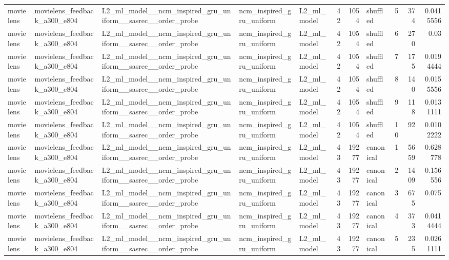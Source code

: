 \begin{table}[htbp!]
\begin{tabular}{lllllrrlrrr}
movielens & movielens\_feedback\_a300\_e804 & L2\_ml\_model\_\_ncm\_inspired\_gru\_uniform\_\_sasrec\_\_order\_probe & ncm\_inspired\_gru\_uniform & L2\_ml\_model & 42 & 1054 & shuffled & 5 & 374 & 0.0415556 \\
movielens & movielens\_feedback\_a300\_e804 & L2\_ml\_model\_\_ncm\_inspired\_gru\_uniform\_\_sasrec\_\_order\_probe & ncm\_inspired\_gru\_uniform & L2\_ml\_model & 42 & 1054 & shuffled & 6 & 270 & 0.03 \\
movielens & movielens\_feedback\_a300\_e804 & L2\_ml\_model\_\_ncm\_inspired\_gru\_uniform\_\_sasrec\_\_order\_probe & ncm\_inspired\_gru\_uniform & L2\_ml\_model & 42 & 1054 & shuffled & 7 & 175 & 0.0194444 \\
movielens & movielens\_feedback\_a300\_e804 & L2\_ml\_model\_\_ncm\_inspired\_gru\_uniform\_\_sasrec\_\_order\_probe & ncm\_inspired\_gru\_uniform & L2\_ml\_model & 42 & 1054 & shuffled & 8 & 140 & 0.0155556 \\
movielens & movielens\_feedback\_a300\_e804 & L2\_ml\_model\_\_ncm\_inspired\_gru\_uniform\_\_sasrec\_\_order\_probe & ncm\_inspired\_gru\_uniform & L2\_ml\_model & 42 & 1054 & shuffled & 9 & 118 & 0.0131111 \\
movielens & movielens\_feedback\_a300\_e804 & L2\_ml\_model\_\_ncm\_inspired\_gru\_uniform\_\_sasrec\_\_order\_probe & ncm\_inspired\_gru\_uniform & L2\_ml\_model & 42 & 1054 & shuffled & 10 & 92 & 0.0102222 \\
movielens & movielens\_feedback\_a300\_e804 & L2\_ml\_model\_\_ncm\_inspired\_gru\_uniform\_\_sasrec\_\_order\_probe & ncm\_inspired\_gru\_uniform & L2\_ml\_model & 43 & 19277 & canonical & 1 & 5659 & 0.628778 \\
movielens & movielens\_feedback\_a300\_e804 & L2\_ml\_model\_\_ncm\_inspired\_gru\_uniform\_\_sasrec\_\_order\_probe & ncm\_inspired\_gru\_uniform & L2\_ml\_model & 43 & 19277 & canonical & 2 & 1409 & 0.156556 \\
movielens & movielens\_feedback\_a300\_e804 & L2\_ml\_model\_\_ncm\_inspired\_gru\_uniform\_\_sasrec\_\_order\_probe & ncm\_inspired\_gru\_uniform & L2\_ml\_model & 43 & 19277 & canonical & 3 & 675 & 0.075 \\
movielens & movielens\_feedback\_a300\_e804 & L2\_ml\_model\_\_ncm\_inspired\_gru\_uniform\_\_sasrec\_\_order\_probe & ncm\_inspired\_gru\_uniform & L2\_ml\_model & 43 & 19277 & canonical & 4 & 373 & 0.0414444 \\
movielens & movielens\_feedback\_a300\_e804 & L2\_ml\_model\_\_ncm\_inspired\_gru\_uniform\_\_sasrec\_\_order\_probe & ncm\_inspired\_gru\_uniform & L2\_ml\_model & 43 & 19277 & canonical & 5 & 235 & 0.0261111 \\

\end{tabular}
\end{table}
